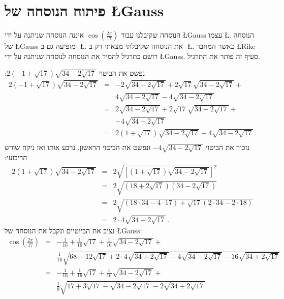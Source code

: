 \documentclass[11pt,a4paper]{article}
\newenvironment{form}[1]{%
\begin{displaymath}%
\renewcommand{\arraystretch}{#1}%
\begin{array}{lcl}}%
{\end{array}%
\end{displaymath}%
}
\newcommand*{\disfrac}[2]{\displaystyle\frac{#1}{#2}}
\begin{document}
\clearpage

\section{פיתוח הנוסחה של %
\L{Gauss}%
}\label{s.derivation}

הנוסחה שקיבלנו עבור 
$\cos\left(\disfrac{2\pi}{17}\right)$
איננה הנוסחה שניתנה על ידי
\L{Gauss}
עצמו
\L{\cite[458 ]{gauss}}.
הנוסחה של 
\L{Gauss}
מופיעה גם ב-%
\L{\cite[68 ]{jorg}}.
את הנוסחה שקיבלתי מצאתי רק ב-%
\L{\cite{rike}},
כאשר המחבר
\L{Rike}
רושם כתרגיל להמיר את הנוסחה לנוסחה שניתנה על ידי 
\L{Gauss}.
סעיף זה פותר את התרגיל.

נפשט את הביטוי
$2(-1+\sqrt{17})\sqrt{34-2\sqrt{17}}$:
\begin{form}{1.7}
2(-1+\sqrt{17})\sqrt{34-2\sqrt{17}} &=&
-2\sqrt{34-2\sqrt{17}} +2\sqrt{17}\sqrt{34-2\sqrt{17}}+\\
&&4\sqrt{34-2\sqrt{17}}-4\sqrt{34-2\sqrt{17}}\\
&=&
2\sqrt{34-2\sqrt{17}} +2\sqrt{17}\sqrt{34-2\sqrt{17}}+\\
&&-4\sqrt{34-2\sqrt{17}}\\
&=&2(1+\sqrt{17})\sqrt{34-2\sqrt{17}}-4\sqrt{34-2\sqrt{17}}\,.\\
\end{form}
נזכור את הביטוי
$-4\sqrt{34-2\sqrt{17}}$
ונפשט את הביטוי הראשון. נרבע אותו ואז ניקח שורש הריבועי:
\begin{form}{1.8}
2(1+\sqrt{17})\sqrt{34-2\sqrt{17}}&=&
2\sqrt{\left[(1+\sqrt{17})\sqrt{34-2\sqrt{17}}\right]^2}\\
&=&2\sqrt{(18+2\sqrt{17})(34-2\sqrt{17})}\\
&=&2\sqrt{(18\cdot 34-4\cdot17)+\sqrt{17}(2\cdot 34 - 2\cdot 18)}\\
&=&2\cdot 4\sqrt{34+2\sqrt{17}}\,.
\end{form}
נציב את הביוטיים ונקבל את הנוסחה של \L{Gauss}:
\begin{form}{2.2}
\cos\left(\disfrac{2\pi}{17}\right) &=& 
-\disfrac{1}{16}+\disfrac{1}{16}\sqrt{17} + 
     \disfrac{1}{16}\sqrt{34-2\sqrt{17}}
    + \\
    &&
     \disfrac{1}{16}\sqrt{
     68+12\sqrt{17} + 
     2\cdot 4\sqrt{34+2\sqrt{17}}-4\sqrt{34-2\sqrt{17}}
   -16
     \sqrt{34+2\sqrt{17}}
   }\\
&=&-\disfrac{1}{16}+\frac{1}{16}\sqrt{17} + 
     \disfrac{1}{16}\sqrt{34-2\sqrt{17}}
    + \\
    &&
     \disfrac{1}{8}\sqrt{
     17+3\sqrt{17} - 
     \sqrt{34-2\sqrt{17}}
   -2
     \sqrt{34+2\sqrt{17}}
   }
\end{form}
\end{document}
